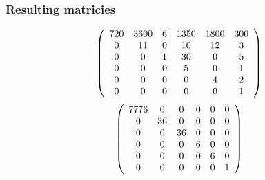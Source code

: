 \subsubsection{Resulting matricies}
\[
\left(
\begin{array}{c c c c c c}
720 & 3600 & 6 & 1350 & 1800 & 300\\
0 & 11 & 0 & 10 & 12 & 3\\
0 & 0 & 1 & 30 & 0 & 5\\
0 & 0 & 0 & 5 & 0 & 1\\
0 & 0 & 0 & 0 & 4 & 2\\
0 & 0 & 0 & 0 & 0 & 1\\
\end{array}
\right)
\]
\[
\left(
\begin{array}{c c c c c c}

7776&0	& 0 	& 0		&0	&0\\
0	&36	& 0 	& 0		&0	&0\\
0 	&0	& 36	& 0		&0	&0\\
0 	&0	& 0		& 6		&0	&0\\
0 	&0	& 0		& 0		&6	&0\\
0 	&0	& 0		& 0		&0	&1
\end{array}
\right)
\]
